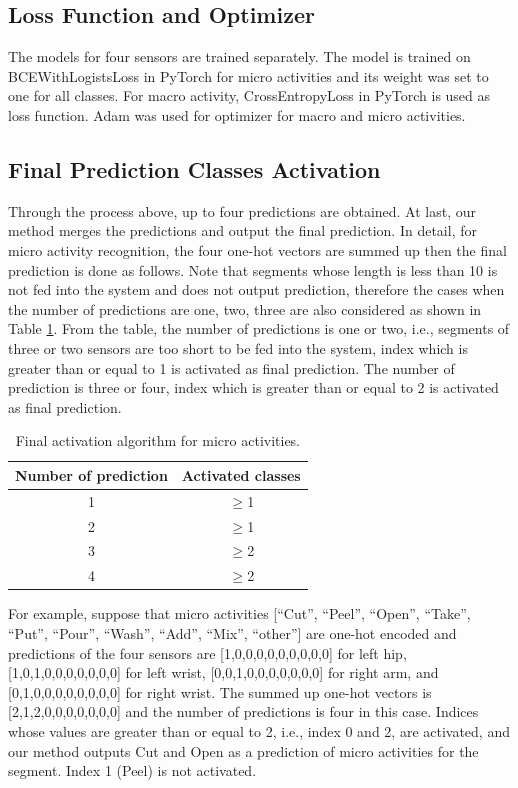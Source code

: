 \documentclass{svmult}
\begin{document}
\subsection{Loss Function and Optimizer}
The models for four sensors are trained separately. The model is trained on BCEWithLogistsLoss in PyTorch for micro activities and its weight was set to one for all classes. For macro activity, CrossEntropyLoss in PyTorch is used as loss function. Adam was used for optimizer for macro and micro activities. 

\subsection{Final Prediction Classes Activation}
Through the process above, up to four predictions are obtained. At last, our method merges the predictions and output the final prediction.
In detail, for micro activity recognition, the four one-hot vectors are summed up then the final prediction is done as follows. Note that segments whose length is less than 10 is not fed into the system and does not output prediction, therefore the cases when the number of predictions are one, two, three are also considered as shown in Table \ref{tab:activation}. From the table, the number of predictions is one or two, i.e., segments of three or two sensors are too short to be fed into the system, index which is greater than or equal to 1 is activated as final prediction. The number of prediction is three or four, index which is greater than or equal to 2 is activated as final prediction. 

\begin{table}[h]
    \caption{Final activation algorithm for micro activities.}
    \centering
    \begin{tabular}{c|c}\hline\hline
        Number of prediction & Activated classes \\\hline
        1 & $\geq$1\\
        2 & $\geq$1\\
        3 & $\geq$2\\
        4 & $\geq$2\\\hline
    \end{tabular}
    \label{tab:activation}
\end{table}

For example, suppose that micro activities [``Cut'', ``Peel'', ``Open'', ``Take'', ``Put'', ``Pour'', ``Wash'', ``Add'', ``Mix'', ``other''] are one-hot encoded and predictions of the four sensors are [1,0,0,0,0,0,0,0,0,0] for left hip, [1,0,1,0,0,0,0,0,0,0] for left wrist, [0,0,1,0,0,0,0,0,0,0] for right arm, and [0,1,0,0,0,0,0,0,0,0] for right wrist. The summed up one-hot vectors is [2,1,2,0,0,0,0,0,0,0] and the number of predictions is four in this case. Indices whose values are greater than or equal to 2, i.e., index 0 and 2, are activated, and our method outputs Cut and Open as a prediction of micro activities for the segment. Index 1 (Peel) is not activated.
\end{document}
